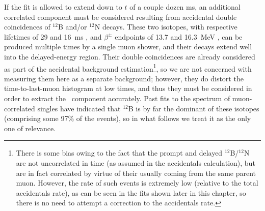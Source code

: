 \documentclass[../thesis.tex]{subfiles}
\begin{document}
If the fit is allowed to extend down to $t$ of a couple dozen ms, an additional correlated component must be considered resulting from accidental double coincidences of $^{12}$B and/or $^{12}$N decays. These two isotopes, with respective lifetimes of 29 and 16~ms \cite{ENDF}, and $\beta^\pm$ endpoints of 13.7 and 16.3~MeV \cite{ENDF}, can be produced multiple times by a single muon shower, and their decays extend well into the delayed-energy region. Their double coincidences are already considered as part of the accidental background estimation\footnote{There is some bias owing to the fact that the prompt and delayed $^{12}$B/$^{12}$N are not uncorrelated in time (as assumed in the accidentals calculation), but are in fact correlated by virtue of their usually coming from the same parent muon. However, the rate of such events is extremely low (relative to the total accidentals rate), as can be seen in the fits shown later in this chapter, so there is no need to attempt a correction to the accidentals rate.}, so we are not concerned with measuring them here as a separate background; however, they do distort the time-to-last-muon histogram at low times, and thus they must be considered in order to extract the \linine\ component accurately. Past fits \cite{NonlinearityPaper} to the spectrum of muon-correlated singles have indicated that $^{12}$B is by far the dominant of these isotopes (comprising some 97\% of the events), so in what follows we treat it as the only one of relevance.
\end{document}
